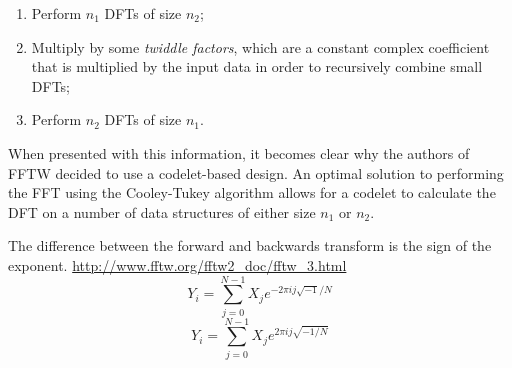 \documentclass[a4paper,11pt]{report}
\begin{document}
\begin{enumerate}
	\item Perform $n_{1}$ DFTs of size $n_{2}$;
	\item Multiply by some \textit{twiddle factors}, which are a constant complex coefficient that is multiplied by the input data in order to recursively combine small DFTs;
	\item Perform $n_{2}$ DFTs of size $n_{1}$.
\end{enumerate}

When presented with this information, it becomes clear why the authors of FFTW decided to use a codelet-based design. An optimal solution to performing the FFT using the Cooley-Tukey algorithm allows for a codelet to calculate the DFT on a number of data structures of either size $n_{1}$ or $n_{2}$.
\par
The difference between the forward and backwards transform is the sign of the exponent. \url{http://www.fftw.org/fftw2_doc/fftw_3.html}
\begin{equation}
Y _ { i } = \sum _ { j = 0 } ^ { N - 1 } X _ { j } e ^ { - 2 \pi i j \sqrt { - 1 } / N }
\end{equation}
\begin{equation}
Y _ { i } = \sum _ { j = 0 } ^ { N - 1 } X _ { j } e ^ { 2 \pi i j \sqrt { - 1 / N } }
\end{equation}
\end{document}
